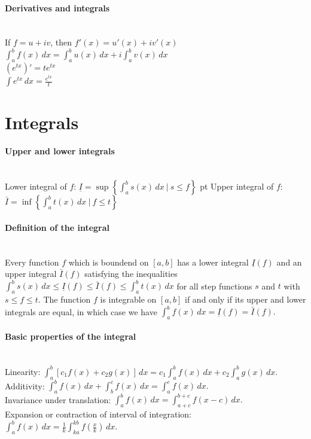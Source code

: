 \documentclass[10pt]{article}
\begin{document}
\paragraph{Derivatives and integrals}\ \\
If $f=u+iv$, then $f'(x)=u'(x)+iv'(x)$\\
$\int_a^bf(x)\,dx=\int_a^bu(x)\,dx+i\int_a^bv(x)\,dx$\\
$(e^{tx})'=te^{tx}$\\
$\int e^{tx}\,dx=\frac{e^{tx}}{t}$



\bigskip\bigskip
\section{Integrals}\smallskip

\paragraph{Upper and lower integrals}\ \\ 
Lower integral of $f$:
$\underline{I} = \sup \left\{ \int_a^b s(x)\,dx\ |\ s \leq f \right\}$  pt
Upper integral of $f$:
$\bar{I} = \inf \left\{ \int_a^b t(x)\,dx\ |\ f \leq t \right\}$

\paragraph{Definition of the integral}\ \\
Every function $f$ which is boundend on $[a, b]$ has a lower integral $\underline{I}(f)$
and an upper integral $\bar{I}(f)$ satisfying the inequalities
$\int_a^b s(x)\,dx \leq \underline{I}(f) \leq \bar{I}(f) \leq \int_a^b t(x)\,dx$
for all step functions $s$ and $t$ with $s \leq f \leq t$. The function $f$ is integrable
on $[a, b]$ if and only if its upper and lower integrals are equal, in which case we have
$\int_a^b f(x)\,dx = \underline{I}(f) = \bar{I}(f).$

\paragraph{Basic properties of the integral}\ \\
Linearity: $\int_a^b [c_1 f(x) + c_2 g(x)]\,dx = c_1 \int_a^b f(x)\,dx + c_2 \int_a^b g(x)\,dx.$\\
Additivity: $\int_a^b f(x)\,dx + \int_b^c f(x)\,dx = \int_a^c f(x)\,dx.$\\
Invariance under translation: $\int_a^b f(x)\,dx = \int_{a+c}^{b+c} f(x - c)\,dx.$\\
Expansion or contraction of interval of integration: 
$\int_a^b f(x)\,dx = \frac{1}{k} \int_{ka}^{kb} f\left(\frac{x}{k}\right)\,dx.$
\end{document}
